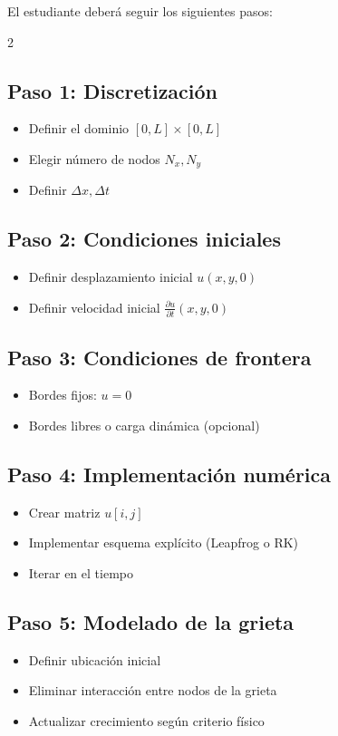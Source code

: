 \documentclass[a4paper,10pt]{exam}
\begin{document}
El estudiante deberá seguir los siguientes pasos:
\begin{multicols}{2}
\subsection*{Paso 1: Discretización}
\begin{itemize}
\item Definir el dominio $[0,L]\times[0,L]$
\item Elegir número de nodos $N_x, N_y$
\item Definir $\Delta x, \Delta t$
\end{itemize}

\subsection*{Paso 2: Condiciones iniciales}
\begin{itemize}
\item Definir desplazamiento inicial $u(x,y,0)$
\item Definir velocidad inicial $\frac{\partial u}{\partial t}(x,y,0)$
\end{itemize}

\subsection*{Paso 3: Condiciones de frontera}
\begin{itemize}
\item Bordes fijos: $u=0$
\item Bordes libres o carga dinámica (opcional)
\end{itemize}

\subsection*{Paso 4: Implementación numérica}
\begin{itemize}
\item Crear matriz $u[i,j]$
\item Implementar esquema explícito (Leapfrog o RK)
\item Iterar en el tiempo
\end{itemize}

\subsection*{Paso 5: Modelado de la grieta}
\begin{itemize}
\item Definir ubicación inicial
\item Eliminar interacción entre nodos de la grieta
\item Actualizar crecimiento según criterio físico
\end{itemize}


\end{multicols}
\end{document}
